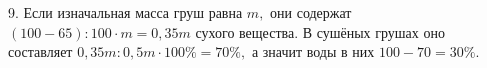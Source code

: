 9. Если изначальная масса груш равна $m,$ они содержат $(100-65):100\cdot m=0,35m$ сухого вещества. В сушёных грушах оно составляет $0,35m:0,5m\cdot100\%=70\%,$ а значит воды в них $100-70=30\%.$\\
